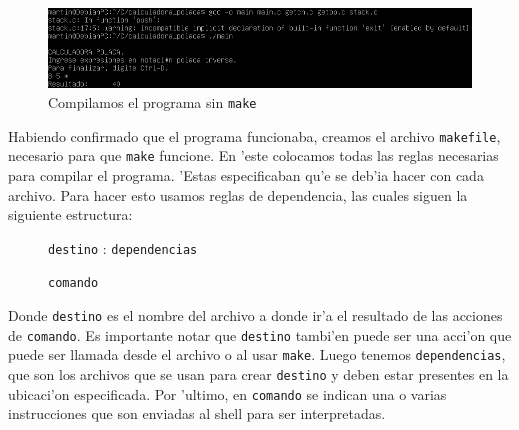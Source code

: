 \documentclass[11pt]{article}
\newcommand{\codetext}[2]{\large\texttt{\textcolor{#1}{#2}}}
\begin{document}
		\begin{figure}[H]
				\centering
				\includegraphics[width=.9\linewidth]{Images/Seccion 2/S2 parte dos.PNG}
				\caption{Compilamos el programa sin \texttt{make}}
				\label{fig:makefile-gcc-compile}
		\end{figure}
	
		Habiendo confirmado que el programa funcionaba, creamos el archivo \texttt{makefile}, necesario para que \texttt{make} funcione. En 'este colocamos todas las reglas necesarias para compilar el programa. 'Estas especificaban qu'e se deb'ia hacer con cada archivo. Para hacer esto usamos reglas de dependencia, las cuales siguen la siguiente estructura:
		
		\begin{figure}[H]
			\centering
			\begin{code-box}
				{\large
					\codetext{light-blue}{destino} : \codetext{orange-desert-vim}{dependencias} \vspace{-2pt}
					
					\quad\codetext{light-red}{comando}
				}
			\end{code-box}
		\end{figure} \vspace{-12pt}
		
		Donde \texttt{\textcolor{light-blue}{destino}} es el nombre del archivo a donde ir'a el resultado de las acciones de \texttt{\textcolor{light-red}{comando}}. Es importante notar que \texttt{\textcolor{light-blue}{destino}} tambi'en puede ser una acci'on que puede ser llamada desde el archivo o al usar \texttt{make}. Luego tenemos \texttt{\textcolor{orange-desert-vim}{dependencias}}, que son los archivos que se usan para crear \texttt{\textcolor{light-blue}{destino}} y deben estar presentes en la ubicaci'on especificada. Por 'ultimo, en  \texttt{\textcolor{light-red}{comando}} se indican una o varias instrucciones que son enviadas al shell para ser interpretadas.
		
\end{document}
